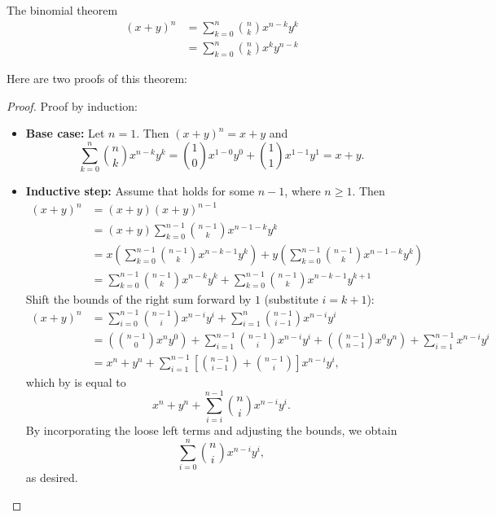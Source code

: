 \begin{bdef}{The binomial theorem}\label{bth}
    \[
        \begin{aligned}
            (x + y)^n &= \sum^n_{k = 0} \binom{n}{k} x^{n-k}y^k \\
            &= \sum^n_{k=0} \binom{n}{k} x^ky^{n-k}
        \end{aligned}
    \]
\end{bdef}
Here are two proofs of this theorem:
\begin{proof}
    Proof by induction:
    \begin{itemize}
        \item \textbf{Base case:}
            Let $n = 1$. Then $(x+y)^n = x + y$ and \[
                \sum^n_{k=0}\binom{n}{k} x^{n-k}y^{k} = \binom{1}{0} x^{1-0}y^0 + \binom{1}{1}x^{1-1}y^1 = x + y.    
            \]
        \item \textbf{Inductive step:} Assume that  holds for some $n-1$, where $n \geq 1$. Then \[
            \begin{aligned}
                (x+y)^{n} &= (x+y)(x+y)^{n-1} \\ 
                &= (x+y)\sum^{n-1}_{k=0}\binom{n-1}{k}x^{n-1-k}y^k \\
                &= x\left(\sum^{n-1}_{k=0}\binom{n-1}{k} x^{n-k-1}y^k\right) + y\left(\sum^{n-1}_{k=0}\binom{n-1}{k} x^{n-1-k}y^k\right) \\
                &= \sum^{n-1}_{k=0} \binom{n-1}{k} x^{n-k}y^k + \sum^{n-1}_{k = 0}\binom{n-1}{k}x^{n-k-1}y^{k+1}
            \end{aligned}
        \] Shift the bounds of the right sum forward by $1$ (substitute $i = k+1$): \[
            \begin{aligned}
                (x+y)^{n} &= \sum^{n-1}_{i=0} \binom{n-1}{i}x^{n-i}y^i + \sum^{n}_{i = 1} \binom{n-1}{i - 1} x^{n-i}y^i \\ 
                &= \left( \binom{n-1}{0} x^ny^0 \right) + \sum^{n-1}_{i=1} \binom{n-1}{i} x^{n-i}y^i + \left( \binom{n - 1}{n - 1} x^{0}y^n \right) + \sum^{n-1}_{i=1} x^{n-i}y^i \\
                &= x^n + y^n + \sum^{n-1}_{i=1} \left[ \binom{n-1}{i-1} + \binom{n - 1}{i} \right] x^{n-i}y^i,
            \end{aligned}
        \] which by  is equal to \[
            x^n + y^n + \sum^{n-1}_{i=i} \binom{n}{i} x^{n-i}y^i.
        \] By incorporating the loose left terms and adjusting the bounds, we obtain \[
            \sum^{n}_{i=0} \binom{n}{i} x^{n-i}y^i,    
        \] as desired.
    \end{itemize}
\end{proof}

